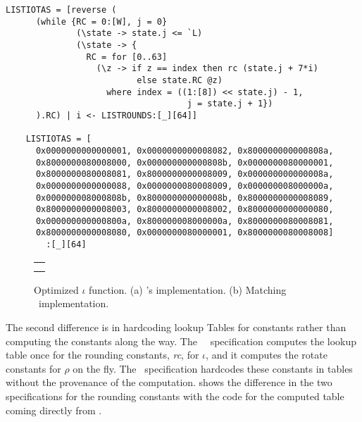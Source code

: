 \newsavebox{\cryciota}
\begin{lrbox}{\cryciota}
  \begin{lstlisting}[language=Cryptol]
    LISTIOTAS = [reverse (
      (while {RC = 0:[W], j = 0} 
              (\state -> state.j <= `L) 
              (\state -> { 
                RC = for [0..63] 
                  (\z -> if z == index then rc (state.j + 7*i)
                          else state.RC @z)
                    where index = ((1:[8]) << state.j) - 1,
                                    j = state.j + 1})
      ).RC) | i <- LISTROUNDS:[_][64]]

    LISTIOTAS = [
      0x0000000000000001, 0x0000000000008082, 0x800000000000808a,
      0x8000000080008000, 0x000000000000808b, 0x0000000080000001,
      0x8000000080008081, 0x8000000000008009, 0x000000000000008a,
      0x0000000000000088, 0x0000000080008009, 0x000000008000000a,
      0x000000008000808b, 0x800000000000008b, 0x8000000000008089,
      0x8000000000008003, 0x8000000000008002, 0x8000000000000080,
      0x000000000000800a, 0x800000008000000a, 0x8000000080008081,
      0x8000000000008080, 0x0000000080000001, 0x8000000080008008]
        :[_][64]
  \end{lstlisting}    
\end{lrbox}

\begin{figure}[t]
  \begin{center}
    \begin{tabular}{l}
      \usebox{\cryciota} \\ \\
    \end{tabular}
  \end{center}
  \caption{Optimized $\iota$ function. (a) \openssl's implementation. (b) Matching \cryptol\ implementation.}
  \label{fig:iota}
\end{figure}

The second difference is in hardcoding lookup Tables for constants rather than computing the constants along the way.
The \fips\ \cryptol\ specification computes the lookup table once for the rounding constants, \emph{rc}, for $\iota$, and it computes the rotate constants for $\rho$ on the fly.
The \openssl\ specification hardcodes these constants in tables without the provenance of the computation.
 shows the difference in the two specifications for the rounding constants with the code for the computed table coming directly from \fips.